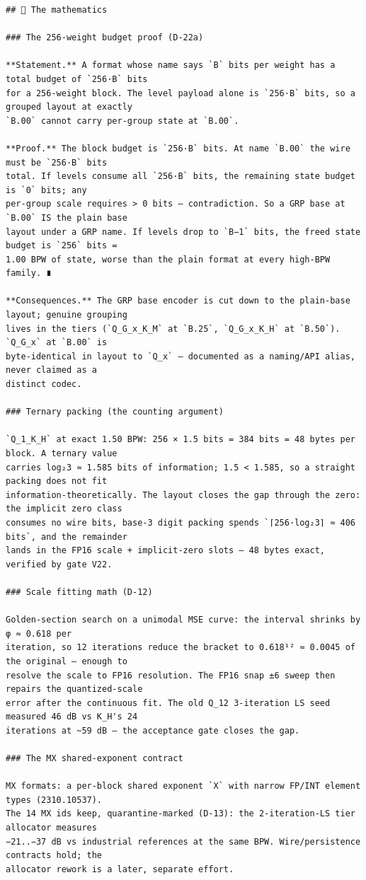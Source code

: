 \begin{Verbatim}[breaklines,breakanywhere,fontsize=\footnotesize]
## 🧮 The mathematics

### The 256-weight budget proof (D-22a)

**Statement.** A format whose name says `B` bits per weight has a total budget of `256·B` bits
for a 256-weight block. The level payload alone is `256·B` bits, so a grouped layout at exactly
`B.00` cannot carry per-group state at `B.00`.

**Proof.** The block budget is `256·B` bits. At name `B.00` the wire must be `256·B` bits
total. If levels consume all `256·B` bits, the remaining state budget is `0` bits; any
per-group scale requires > 0 bits — contradiction. So a GRP base at `B.00` IS the plain base
layout under a GRP name. If levels drop to `B−1` bits, the freed state budget is `256` bits =
1.00 BPW of state, worse than the plain format at every high-BPW family. ∎

**Consequences.** The GRP base encoder is cut down to the plain-base layout; genuine grouping
lives in the tiers (`Q_G_x_K_M` at `B.25`, `Q_G_x_K_H` at `B.50`). `Q_G_x` at `B.00` is
byte-identical in layout to `Q_x` — documented as a naming/API alias, never claimed as a
distinct codec.

### Ternary packing (the counting argument)

`Q_1_K_H` at exact 1.50 BPW: 256 × 1.5 bits = 384 bits = 48 bytes per block. A ternary value
carries log₂3 ≈ 1.585 bits of information; 1.5 < 1.585, so a straight packing does not fit
information-theoretically. The layout closes the gap through the zero: the implicit zero class
consumes no wire bits, base-3 digit packing spends `⌈256·log₂3⌉ ≈ 406 bits`, and the remainder
lands in the FP16 scale + implicit-zero slots — 48 bytes exact, verified by gate V22.

### Scale fitting math (D-12)

Golden-section search on a unimodal MSE curve: the interval shrinks by φ ≈ 0.618 per
iteration, so 12 iterations reduce the bracket to 0.618¹² ≈ 0.0045 of the original — enough to
resolve the scale to FP16 resolution. The FP16 snap ±6 sweep then repairs the quantized-scale
error after the continuous fit. The old Q_12 3-iteration LS seed measured 46 dB vs K_H's 24
iterations at ~59 dB — the acceptance gate closes the gap.

### The MX shared-exponent contract

MX formats: a per-block shared exponent `X` with narrow FP/INT element types (2310.10537).
The 14 MX ids keep, quarantine-marked (D-13): the 2-iteration-LS tier allocator measures
−21..−37 dB vs industrial references at the same BPW. Wire/persistence contracts hold; the
allocator rework is a later, separate effort.


\end{Verbatim}
